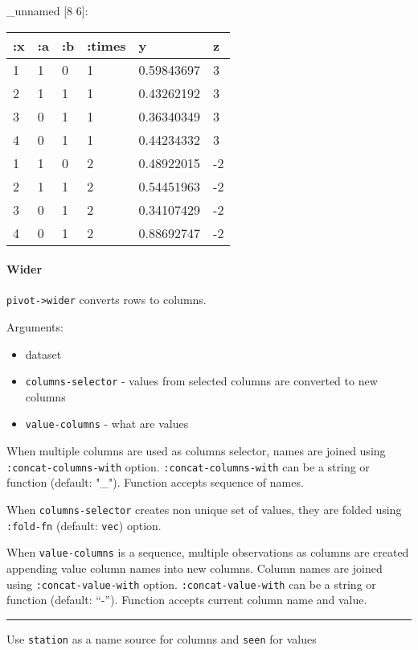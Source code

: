\documentclass[]{article}
\providecommand{\tightlist}{%
  \setlength{\itemsep}{0pt}\setlength{\parskip}{0pt}}
\let\oldparagraph\paragraph
\renewcommand{\paragraph}[1]{\oldparagraph{#1}\mbox{}}
\begin{document}
\_unnamed {[}8 6{]}:

\begin{longtable}[]{@{}llllll@{}}
\toprule
:x & :a & :b & :times & y & z\tabularnewline
\midrule
\endhead
1 & 1 & 0 & 1 & 0.59843697 & 3\tabularnewline
2 & 1 & 1 & 1 & 0.43262192 & 3\tabularnewline
3 & 0 & 1 & 1 & 0.36340349 & 3\tabularnewline
4 & 0 & 1 & 1 & 0.44234332 & 3\tabularnewline
1 & 1 & 0 & 2 & 0.48922015 & -2\tabularnewline
2 & 1 & 1 & 2 & 0.54451963 & -2\tabularnewline
3 & 0 & 1 & 2 & 0.34107429 & -2\tabularnewline
4 & 0 & 1 & 2 & 0.88692747 & -2\tabularnewline
\bottomrule
\end{longtable}

\hypertarget{wider}{%
\paragraph{Wider}\label{wider}}

\texttt{pivot-\textgreater{}wider} converts rows to columns.

Arguments:

\begin{itemize}
\tightlist
\item
  dataset
\item
  \texttt{columns-selector} - values from selected columns are converted
  to new columns
\item
  \texttt{value-columns} - what are values
\end{itemize}

When multiple columns are used as columns selector, names are joined
using \texttt{:concat-columns-with} option.
\texttt{:concat-columns-with} can be a string or function (default:
"\_"). Function accepts sequence of names.

When \texttt{columns-selector} creates non unique set of values, they
are folded using \texttt{:fold-fn} (default: \texttt{vec}) option.

When \texttt{value-columns} is a sequence, multiple observations as
columns are created appending value column names into new columns.
Column names are joined using \texttt{:concat-value-with} option.
\texttt{:concat-value-with} can be a string or function (default:
``-''). Function accepts current column name and value.

\begin{center}\rule{0.5\linewidth}{0.5pt}\end{center}

Use \texttt{station} as a name source for columns and \texttt{seen} for
values
\end{document}

